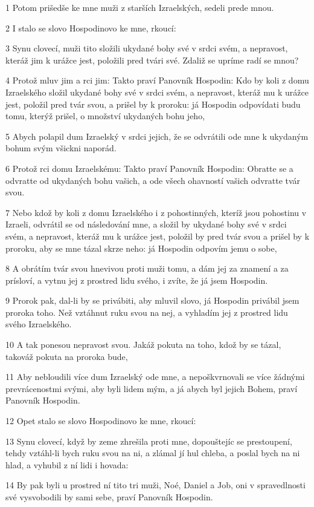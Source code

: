\par 1 Potom prišedše ke mne muži z starších Izraelských, sedeli prede mnou.
\par 2 I stalo se slovo Hospodinovo ke mne, rkoucí:
\par 3 Synu clovecí, muži tito složili ukydané bohy své v srdci svém, a nepravost, kteráž jim k urážce jest, položili pred tvári své. Zdaliž se upríme radí se mnou?
\par 4 Protož mluv jim a rci jim: Takto praví Panovník Hospodin: Kdo by koli z domu Izraelského složil ukydané bohy své v srdci svém, a nepravost, kteráž mu k urážce jest, položil pred tvár svou, a prišel by k proroku: já Hospodin odpovídati budu tomu, kterýž prišel, o množství ukydaných bohu jeho,
\par 5 Abych polapil dum Izraelský v srdci jejich, že se odvrátili ode mne k ukydaným bohum svým všickni naporád.
\par 6 Protož rci domu Izraelskému: Takto praví Panovník Hospodin: Obratte se a odvratte od ukydaných bohu vašich, a ode všech ohavností vašich odvratte tvár svou.
\par 7 Nebo kdož by koli z domu Izraelského i z pohostinných, kteríž jsou pohostinu v Izraeli, odvrátil se od následování mne, a složil by ukydané bohy své v srdci svém, a nepravost, kteráž mu k urážce jest, položil by pred tvár svou a prišel by k proroku, aby se mne tázal skrze neho: já Hospodin odpovím jemu o sobe,
\par 8 A obrátím tvár svou hnevivou proti muži tomu, a dám jej za znamení a za prísloví, a vytnu jej z prostred lidu svého, i zvíte, že já jsem Hospodin.
\par 9 Prorok pak, dal-li by se privábiti, aby mluvil slovo, já Hospodin privábil jsem proroka toho. Než vztáhnut ruku svou na nej, a vyhladím jej z prostred lidu svého Izraelského.
\par 10 A tak ponesou nepravost svou. Jakáž pokuta na toho, kdož by se tázal, takováž pokuta na proroka bude,
\par 11 Aby nebloudili více dum Izraelský ode mne, a nepoškvrnovali se více žádnými prevrácenostmi svými, aby byli lidem mým, a já abych byl jejich Bohem, praví Panovník Hospodin.
\par 12 Opet stalo se slovo Hospodinovo ke mne, rkoucí:
\par 13 Synu clovecí, když by zeme zhrešila proti mne, dopouštejíc se prestoupení, tehdy vztáhl-li bych ruku svou na ni, a zlámal jí hul chleba, a poslal bych na ni hlad, a vyhubil z ní lidi i hovada:
\par 14 By pak byli u prostred ní tito tri muži, Noé, Daniel a Job, oni v spravedlnosti své vysvobodili by sami sebe, praví Panovník Hospodin.
